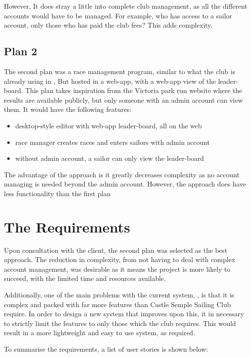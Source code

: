 \documentclass{l4proj}
\begin{document}
However, It does stray a little into complete club management, as all the different accounts would have to be managed. For example, who has access to a sailor account, only those who has paid the club fees? This adds complexity.

\subsection{Plan 2}
The second plan was a race management program, similar to what the club is already using in \citet{sailwave}, But hosted in a web-app, with a web-app view of the leader-board. This plan takes inspiration from the Victoria park run website \citeyear{Parkrun} where the results are available publicly, but only someone with an admin account can view them. It would have the following features:
\begin{itemize}
    \item
    desktop-style editor with web-app leader-board, all on the web
    \item
    race manager creates races and enters sailors with admin account
    \item
    without admin account, a sailor can only view the leader-board
\end{itemize}

The advantage of the approach is it greatly decreases complexity as no account managing is needed beyond the admin account. However, the approach does have less functionality than the first plan

\section{The Requirements}
Upon consultation with the client, the second plan was selected as the best approach. The reduction in complexity, from not having to deal with complex account management, was desirable as it means the project is more likely to succeed, with the limited time and
resources available.

Additionally, one of the main problems with the current system, \citep{sailwave}, is that it is complex and packed with far more features than Castle Semple Sailing Club require. In order to design a new system that improves upon this, it in necessary to strictly limit the features to only those which the club requires. This would result in a more lightweight and easy to use system, as required.

To summarise the requirements, a list of user stories is shown below:
\end{document}
